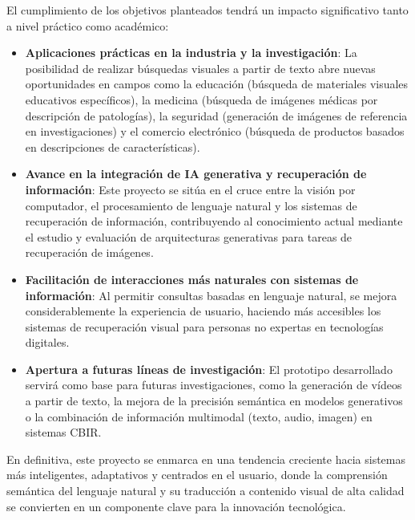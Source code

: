 \vspace{0.5cm}

El cumplimiento de los objetivos planteados tendrá un impacto significativo tanto a nivel práctico como académico:

\begin{itemize}
    \item \textbf{Aplicaciones prácticas en la industria y la investigación}: La posibilidad de realizar búsquedas visuales a partir de texto abre nuevas oportunidades en campos como la educación (búsqueda de materiales visuales educativos específicos), la medicina (búsqueda de imágenes médicas por descripción de patologías), la seguridad (generación de imágenes de referencia en investigaciones) y el comercio electrónico (búsqueda de productos basados en descripciones de características).
    
    \item \textbf{Avance en la integración de IA generativa y recuperación de información}: Este proyecto se sitúa en el cruce entre la visión por computador, el procesamiento de lenguaje natural y los sistemas de recuperación de información, contribuyendo al conocimiento actual mediante el estudio y evaluación de arquitecturas generativas para tareas de recuperación de imágenes.
    
    \item \textbf{Facilitación de interacciones más naturales con sistemas de información}: Al permitir consultas basadas en lenguaje natural, se mejora considerablemente la experiencia de usuario, haciendo más accesibles los sistemas de recuperación visual para personas no expertas en tecnologías digitales.
    
    \item \textbf{Apertura a futuras líneas de investigación}: El prototipo desarrollado servirá como base para futuras investigaciones, como la generación de vídeos a partir de texto, la mejora de la precisión semántica en modelos generativos o la combinación de información multimodal (texto, audio, imagen) en sistemas CBIR.
\end{itemize}

En definitiva, este proyecto se enmarca en una tendencia creciente hacia sistemas más inteligentes, adaptativos y centrados en el usuario, donde la comprensión semántica del lenguaje natural y su traducción a contenido visual de alta calidad se convierten en un componente clave para la innovación tecnológica.
